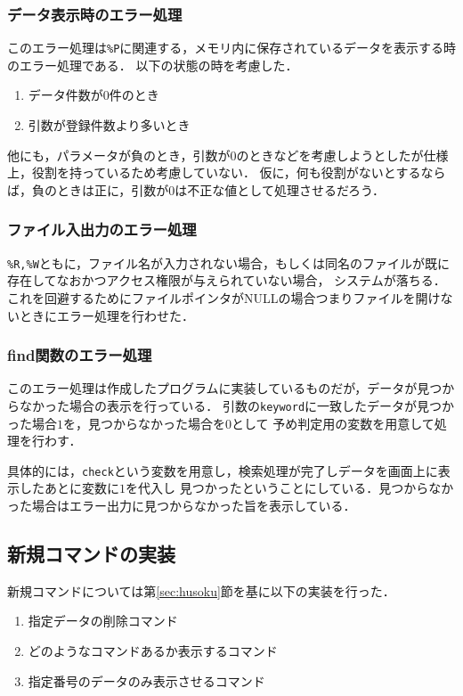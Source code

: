 \documentclass[a4j,11pt]{jarticle}
\begin{document}
\subsubsection{データ表示時のエラー処理}
このエラー処理は\verb|%P|に関連する，メモリ内に保存されているデータを表示する時のエラー処理である．
以下の状態の時を考慮した．\begin{enumerate}
\setlength{\parskip}{2pt} \setlength{\itemsep}{2pt}
    \item データ件数が0件のとき
    \item 引数が登録件数より多いとき
\end{enumerate}
他にも，パラメータが負のとき，引数が$0$のときなどを考慮しようとしたが仕様上，役割を持っているため考慮していない．
仮に，何も役割がないとするならば，負のときは正に，引数が0は不正な値として処理させるだろう．

\subsubsection{ファイル入出力のエラー処理}
\verb|%R,%W|ともに，ファイル名が入力されない場合，もしくは同名のファイルが既に存在してなおかつアクセス権限が与えられていない場合，
システムが落ちる．これを回避するためにファイルポインタがNULLの場合つまりファイルを開けないときにエラー処理を行わせた．
\subsubsection{find関数のエラー処理}
このエラー処理は作成したプログラムに実装しているものだが，データが見つからなかった場合の表示を行っている．
引数の\verb|keyword|に一致したデータが見つかった場合$1$を，見つからなかった場合を$0$として
予め判定用の変数を用意して処理を行わす．

具体的には，\verb|check|という変数を用意し，検索処理が完了しデータを画面上に表示したあとに変数に$1$を代入し
見つかったということにしている．見つからなかった場合はエラー出力に見つからなかった旨を表示している．
\subsection{新規コマンドの実装}
新規コマンドについては第\ref{sec:husoku}節を基に以下の実装を行った．
\begin{enumerate}
\setlength{\parskip}{2pt} \setlength{\itemsep}{2pt}
    \item 指定データの削除コマンド
    \item どのようなコマンドあるか表示するコマンド
    \item 指定番号のデータのみ表示させるコマンド
\end{enumerate}
\end{document}
